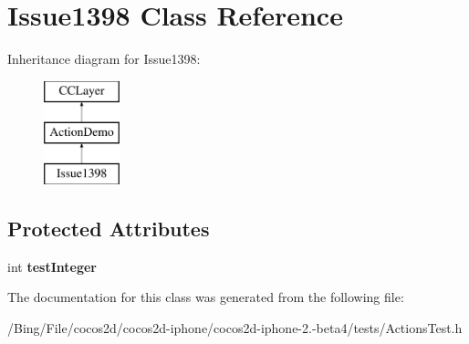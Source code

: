 \hypertarget{interface_issue1398}{\section{Issue1398 Class Reference}
\label{interface_issue1398}
}
Inheritance diagram for Issue1398\-:\begin{figure}[H]
\begin{center}
\leavevmode
\includegraphics[height=3.000000cm]{interface_issue1398}
\end{center}
\end{figure}
\subsection*{Protected Attributes}
\begin{DoxyCompactItemize}
\item 
\hypertarget{interface_issue1398_aa1a689f27e4bba2f785205934b145e1a}{int {\bfseries test\-Integer}}\label{interface_issue1398_aa1a689f27e4bba2f785205934b145e1a}

\end{DoxyCompactItemize}


The documentation for this class was generated from the following file\-:\begin{DoxyCompactItemize}
\item 
/\-Bing/\-File/cocos2d/cocos2d-\/iphone/cocos2d-\/iphone-\/2.-\/beta4/tests/Actions\-Test.\-h\end{DoxyCompactItemize}
